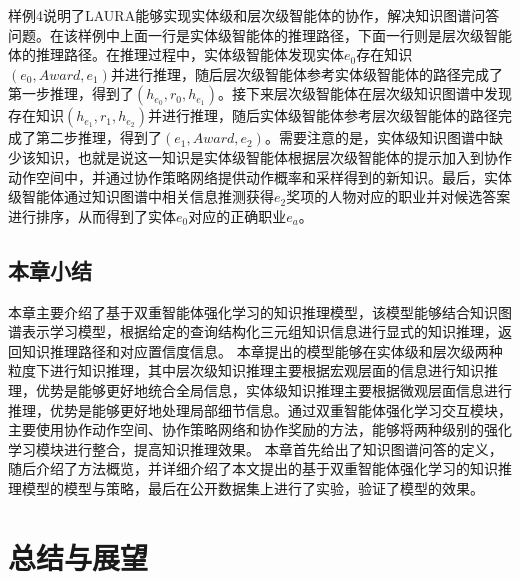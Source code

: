 \documentclass[algorithmlist, AutoFakeBold, AutoFakeSlant, figurelist, tablelist, nomlist, engineering]{seuthesix}
\begin{document}
样例4说明了LAURA能够实现实体级和层次级智能体的协作，解决知识图谱问答问题。在该样例中上面一行是实体级智能体的推理路径，下面一行则是层次级智能体的推理路径。在推理过程中，实体级智能体发现实体$e_0$存在知识$(e_0, Award, e_1)$并进行推理，随后层次级智能体参考实体级智能体的路径完成了第一步推理，得到了$(h_{e_0}, r_0, h_{e_1})$。接下来层次级智能体在层次级知识图谱中发现存在知识$(h_{e_1}, r_1, h_{e_2})$并进行推理，随后实体级智能体参考层次级智能体的路径完成了第二步推理，得到了$(e_1, Award, e_2)$。需要注意的是，实体级知识图谱中缺少该知识，也就是说这一知识是实体级智能体根据层次级智能体的提示加入到协作动作空间中，并通过协作策略网络提供动作概率和采样得到的新知识。最后，实体级智能体通过知识图谱中相关信息推测获得$e_2$奖项的人物对应的职业并对候选答案进行排序，从而得到了实体$e_0$对应的正确职业$e_a$。

\section{本章小结}
本章主要介绍了基于双重智能体强化学习的知识推理模型，该模型能够结合知识图谱表示学习模型，根据给定的查询结构化三元组知识信息进行显式的知识推理，返回知识推理路径和对应置信度信息。
本章提出的模型能够在实体级和层次级两种粒度下进行知识推理，其中层次级知识推理主要根据宏观层面的信息进行知识推理，优势是能够更好地统合全局信息，实体级知识推理主要根据微观层面信息进行推理，优势是能够更好地处理局部细节信息。通过双重智能体强化学习交互模块，主要使用协作动作空间、协作策略网络和协作奖励的方法，能够将两种级别的强化学习模块进行整合，提高知识推理效果。
本章首先给出了知识图谱问答的定义，随后介绍了方法概览，并详细介绍了本文提出的基于双重智能体强化学习的知识推理模型的模型与策略，最后在公开数据集上进行了实验，验证了模型的效果。


\chapter{总结与展望}
\end{document}
